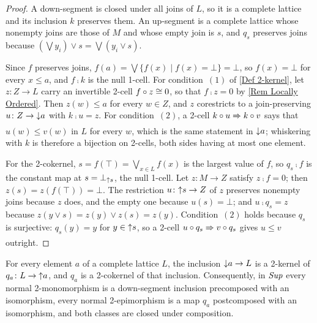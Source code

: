 \begin{proof}
  \leanok
  A down-segment is closed under all joins of \(L\), so it is a complete lattice and its inclusion \(k\) preserves them. An up-segment is a complete lattice whose nonempty joins are those of \(M\) and whose empty join is \(s\), and \(q_{s}\) preserves joins because \((\bigvee y_{i})\vee s=\bigvee(y_{i}\vee s)\).

	Since \(f\) preserves joins, \(f(a)=\bigvee\{f(x)\mid f(x)=\bot\}=\bot\), so \(f(x)=\bot\) for every \(x\leq a\), and \(f\comp k\) is the null 1-cell. For condition~\((1)\) of \ref{Def 2-kernel}, let \(z\colon Z\to L\) carry an invertible 2-cell \(f\circ z\cong 0\), so that \(f\comp z=0\) by \remx\ref{Rem Locally Ordered}. Then \(z(w)\leq a\) for every \(w\in Z\), and \(z\) corestricts to a join-preserving \(u\colon Z\to{\downarrow}a\) with \(k\comp u=z\). For condition~\((2)\), a 2-cell \(k\circ u\xRightarrow[]{}k\circ v\) says that \(u(w)\leq v(w)\) in \(L\) for every \(w\), which is the same statement in \({\downarrow}a\); whiskering with \(k\) is therefore a bijection on 2-cells, both sides having at most one element.

	For the 2-cokernel, \(s=f(\top)=\bigvee_{x\in L}f(x)\) is the largest value of \(f\), so \(q_{s}\comp f\) is the constant map at \(s=\bot_{{\uparrow}s}\), the null 1-cell. Let \(z\colon M\to Z\) satisfy \(z\comp f=0\); then \(z(s)=z(f(\top))=\bot\). The restriction \(u\colon{\uparrow}s\to Z\) of \(z\) preserves nonempty joins because \(z\) does, and the empty one because \(u(s)=\bot\); and \(u\comp q_{s}=z\) because \(z(y\vee s)=z(y)\vee z(s)=z(y)\). Condition~\((2)\) holds because \(q_{s}\) is surjective: \(q_{s}(y)=y\) for \(y\in{\uparrow}s\), so a 2-cell \(u\circ q_{s}\xRightarrow[]{}v\circ q_{s}\) gives \(u\leq v\) outright.
\end{proof}

\begin{corollary}
  \label{C:SupNormal}   \leanok
  For every element \(a\) of a complete lattice \(L\), the inclusion \({\downarrow}a\to L\) is a 2-kernel of \(q_{a}\colon L\to{\uparrow}a\), and \(q_{a}\) is a 2-cokernel of that inclusion. Consequently, in \(\mathit{Sup}\) every normal 2-monomorphism is a down-segment inclusion precomposed with an isomorphism, every normal 2-epimorphism is a map \(q_{a}\) postcomposed with an isomorphism, and both classes are closed under composition.
\end{corollary}

